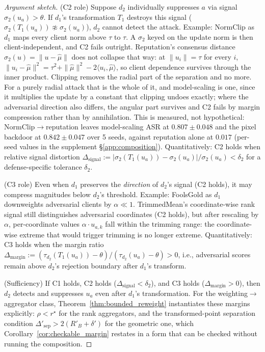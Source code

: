 \documentclass{article}
\begin{document}
\begin{proof}[Argument sketch]
(C2 role) Suppose $d_2$ individually suppresses $a$ via signal $\sigma_2(u_a) > \theta$. If $d_1$'s transformation $T_1$ destroys this signal ($\sigma_2(T_1(u_a)) \not\approx \sigma_2(u_a)$), $d_2$ cannot detect the attack. Example: NormClip as $d_1$ maps every client norm above $\tau$ to $\tau$. A $\sigma_2$ keyed on the update norm is then client-independent, and C2 fails outright. Reputation's consensus distance $\sigma_2(u) = \|u - \hat\mu\|$ does not collapse that way: at $\|u_i\| = \tau$ for every $i$, $\|u_i - \hat\mu\|^2 = \tau^2 + \|\hat\mu\|^2 - 2\langle u_i, \hat\mu\rangle$, so client dependence survives through the inner product. Clipping removes the radial part of the separation and no more. For a purely radial attack that is the whole of it, and model-scaling is one, since it multiplies the update by a constant that clipping undoes exactly; where the adversarial direction also differs, the angular part survives and C2 fails by margin compression rather than by annihilation. This is measured, not hypothetical: NormClip$\to$reputation leaves model-scaling ASR at $0.807 \pm 0.048$ and the pixel backdoor at $0.842 \pm 0.047$ over 5 seeds, against reputation alone at $0.017$ (per-seed values in the supplement §\ref{app:composition}). Quantitatively: C2 holds when relative signal distortion $\Delta_{\mathrm{signal}} := |\sigma_2(T_1(u_a)) - \sigma_2(u_a)|/\sigma_2(u_a) < \delta_2$ for a defense-specific tolerance $\delta_2$.

(C3 role) Even when $d_1$ preserves the \emph{direction} of $d_2$'s signal (C2 holds), it may compress magnitudes below $d_2$'s threshold. Example: FoolsGold as $d_1$ downweights adversarial clients by $\alpha \ll 1$. TrimmedMean's coordinate-wise rank signal still distinguishes adversarial coordinates (C2 holds), but after rescaling by $\alpha$, per-coordinate values $\alpha \cdot u_{a,k}$ fall within the trimming range: the coordinate-wise extreme that would trigger trimming is no longer extreme. Quantitatively: C3 holds when the margin ratio $\Delta_{\mathrm{margin}} := (\tau_{d_2}(T_1(u_a)) - \theta)/(\tau_{d_2}(u_a) - \theta) > 0$, i.e., adversarial scores remain above $d_2$'s rejection boundary after $d_1$'s transform.

(Sufficiency) If C1 holds, C2 holds ($\Delta_{\mathrm{signal}} < \delta_2$), and C3 holds ($\Delta_{\mathrm{margin}} > 0$), then $d_2$ detects and suppresses $u_a$ even after $d_1$'s transformation. For the weighting$\to$aggregator class, Theorem~\ref{thm:bounded_reweight} instantiates these margins explicitly: $\rho < r^\star$ for the rank aggregators, and the transformed-point separation condition $\Delta'_{\mathrm{sep}} > 2(R'_B+\delta')$ for the geometric one, which Corollary~\ref{cor:checkable_margin} restates in a form that can be checked without running the composition. \qedhere
\end{proof}
\end{document}
